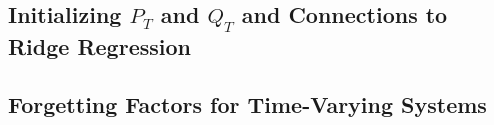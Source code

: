 \subsection{Initializing $P_T$ and $Q_T$ and Connections to Ridge Regression}

\subsection{Forgetting Factors for Time-Varying Systems}
